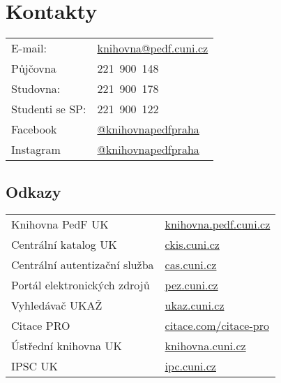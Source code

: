 \section{Kontakty}

\begin{tabular}{@{}ll@{}}
  E-mail:& \url{knihovna@pedf.cuni.cz}\\

  Půjčovna& 221~900~148\\
  Studovna:& 221~900~178\\
  Studenti se SP:& 221~900~122\\
  Facebook & \url{@knihovnapedfpraha}\\
  Instagram & \url{@knihovnapedfpraha}
\end{tabular}

\subsection{Odkazy}

\begin{tabular}{@{}ll@{}}
  Knihovna PedF UK& \url{knihovna.pedf.cuni.cz} \\

  Centrální katalog UK& \url{ckis.cuni.cz} \\

  Centrální autentizační služba& \url{cas.cuni.cz} \\

  Portál elektronických zdrojů& \url{pez.cuni.cz} \\

  Vyhledávač UKAŽ & \url{ukaz.cuni.cz} \\

  Citace PRO & \url{citace.com/citace-pro} \\

  Ústřední knihovna UK & \url{knihovna.cuni.cz} \\

  IPSC UK & \url{ipc.cuni.cz} 
\end{tabular}
